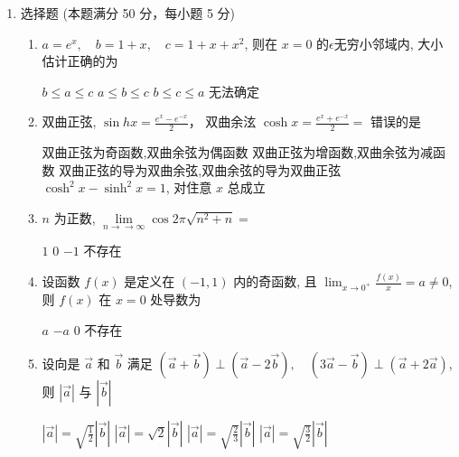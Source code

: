 


\begin{enumerate}
	\item
	选择题 (本题满分 50 分，每小题 5 分)
\begin{enumerate}
	\item
	$a=e^{x}, \quad b=1+x, \quad c=1+x+x^{2}$, 则在 $x=0$ 的$ \epsilon $无穷小邻域内, 大小估计正确的为  
	
\fourchoices
{$ b \leq a \leq c$}
{$a \leq b \leq c$}
{$b \leq c \leq a$}
{无法确定}

\item 
双曲正弦, $\sin h x=\frac{e^{x}-e^{-x}}{2} $， 双曲余泫 $\cosh x=\frac{e^{x}+e^{-x}}{2}=$ 错误的是	  


\fourchoices
{双曲正弦为奇函数,双曲余弦为偶函数}
{双曲正弦为增函数,双曲余弦为减函数}
{双曲正弦的导为双曲余弦,双曲余弦的导为双曲正弦}
{$\cosh ^{2} x-\sinh ^{2} x=1$, 对住意 $x$ 总成立}

\item 
$n$ 为正数, $\lim\limits _{n \rightarrow \rightarrow \infty} \cos 2 \pi \sqrt{n^{2}+n}=$  

\fourchoices
{$ 1 $}
{$ 0 $}
{$-1$}
{不存在}

\item 
设函数 $f(x)$ 是定义在 $(-1,1)$ 内的奇函数, 且 $\lim _{x \rightarrow 0^{+}} \frac{f(x)}{x}=a \neq 0$, 则 $f(x)$ 在 $x=0$ 处导数为  

\fourchoices
{$a$}
{$-a$}
{$ 0 $}
{不存在}

\item 
设向是 $\vec{a}$ 和 $\vec{b}$ 满足 $(\vec{a}+\vec{b}) \perp(\vec{a}-2 \vec{b}), \quad(3 \vec{a}-\vec{b}) \perp(\vec{a}+2 \vec{a})$, 则 $|\vec{a}|$ 与 $|\vec{b}|$  

\fourchoices
{$|\vec{a}|=\sqrt{\frac{1}{2}} |\vec{b}|$}
{$|\vec{a}|=\sqrt{2}|\vec{b}|$}
{$|\vec{a}|=\sqrt{\frac{2}{3}} |\vec{b}|$}
{$|\vec{a}|=\sqrt{\frac{3}{2}} |\vec{b}|$}


\end{enumerate}
\end{enumerate}
